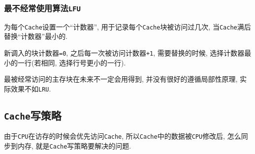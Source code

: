 \subsubsection{最不经常使用算法\texttt{LFU}}
为每个\verb|Cache|设置一个``计数器'', 用于记录每个\verb|Cache|块被访问过几次, 当\verb|Cache|满后替换``计数器''最小的. \par
新调入的块计数器\verb|=0|, 之后每一次被访问计数器\verb|+1|, 需要替换的时候, 选择计数器最小的一行(若相同, 选择行号更小的一行). \par
最被经常访问的主存块在未来不一定会用得到, 并没有很好的遵循局部性原理, 实际效果不如\verb|LRU|.
\subsection{\texttt{Cache}写策略}
由于\verb|CPU|在访存的时候会优先访问\verb|Cache|, 所以\verb|Cache|中的数据被\verb|CPU|修改后, 怎么同步到内存, 就是\verb|Cache|写策略要解决的问题.


